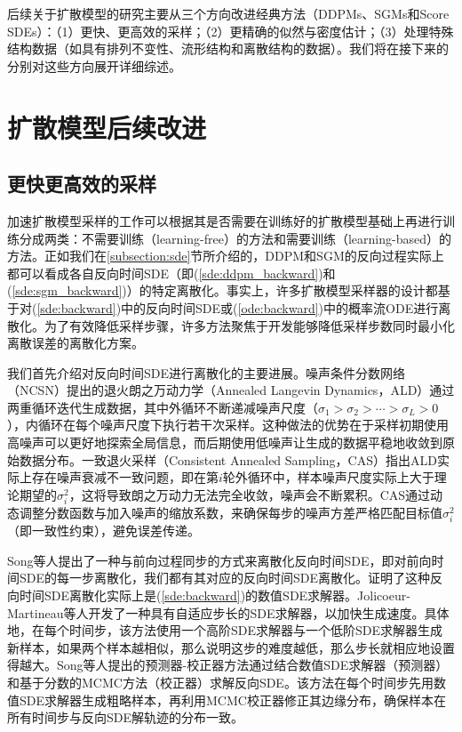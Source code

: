 \documentclass[11pt,a4paper,UTF8]{ctexart}
\begin{document}
后续关于扩散模型的研究主要从三个方向改进经典方法（DDPMs、SGMs和Score SDEs）：（1）更快、更高效的采样；（2）更精确的似然与密度估计；（3）处理特殊结构数据（如具有排列不变性、流形结构和离散结构的数据）。我们将在接下来的分别对这些方向展开详细综述。

\section{扩散模型后续改进}

\subsection{更快更高效的采样}

加速扩散模型采样的工作可以根据其是否需要在训练好的扩散模型基础上再进行训练分成两类：不需要训练（learning-free）的方法和需要训练（learning-based）的方法。正如我们在\ref{subsection:sde}节所介绍的，DDPM和SGM的反向过程实际上都可以看成各自反向时间SDE（即(\ref{sde:ddpm_backward})和(\ref{sde:sgm_backward})）的特定离散化。事实上，许多扩散模型采样器的设计都基于对(\ref{sde:backward})中的反向时间SDE或(\ref{ode:backward})中的概率流ODE进行离散化。为了有效降低采样步骤，许多方法聚焦于开发能够降低采样步数同时最小化离散误差的离散化方案。

我们首先介绍对反向时间SDE进行离散化的主要进展。噪声条件分数网络（NCSN）\cite{song2019generative}提出的退火朗之万动力学（Annealed Langevin Dynamics，ALD）通过两重循环迭代生成数据，其中外循环不断递减噪声尺度（$\sigma_1>\sigma_2>\cdots>\sigma_L>0$），内循环在每个噪声尺度下执行若干次采样。这种做法的优势在于采样初期使用高噪声可以更好地探索全局信息，而后期使用低噪声让生成的数据平稳地收敛到原始数据分布。一致退火采样（Consistent Annealed Sampling，CAS）\cite{JolicoeurMartineau2021AdversarialSM}指出ALD实际上存在噪声衰减不一致问题，即在第$i$轮外循环中，样本噪声尺度实际上大于理论期望的$\sigma_i^2$，这将导致朗之万动力无法完全收敛，噪声会不断累积。CAS通过动态调整分数函数与加入噪声的缩放系数，来确保每步的噪声方差严格匹配目标值$\sigma_i^2$（即一致性约束），避免误差传递。


Song等人\cite{song2020score}提出了一种与前向过程同步的方式来离散化反向时间SDE，即对前向时间SDE的每一步离散化，我们都有其对应的反向时间SDE离散化。\cite{song2020score}证明了这种反向时间SDE离散化实际上是(\ref{sde:backward})的数值SDE求解器。Jolicoeur-Martineau等人\cite{jolicoeur2021gotta}开发了一种具有自适应步长的SDE求解器，以加快生成速度。具体地，在每个时间步，该方法使用一个高阶SDE求解器与一个低阶SDE求解器生成新样本，如果两个样本越相似，那么说明这步的难度越低，那么步长就相应地设置得越大。Song等人\cite{song2020score}提出的预测器-校正器方法通过结合数值SDE求解器（预测器）和基于分数的MCMC方法（校正器）求解反向SDE。该方法在每个时间步先用数值SDE求解器生成粗略样本，再利用MCMC校正器修正其边缘分布，确保样本在所有时间步与反向SDE解轨迹的分布一致。
\end{document}
